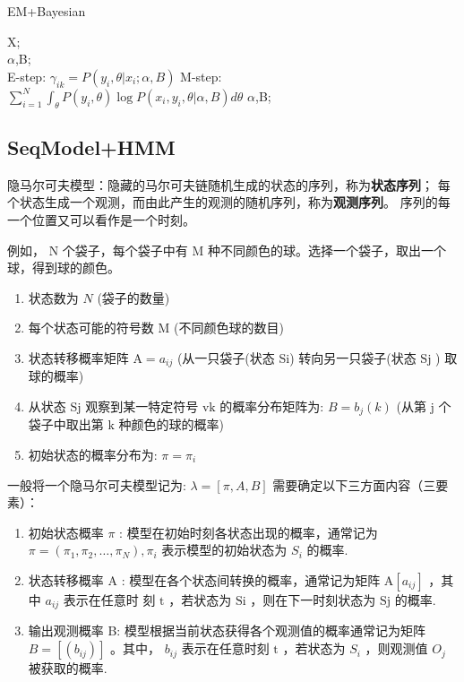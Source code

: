 \documentclass[UTF8]{ctexart}
\begin{document}
\begin{algorithm}[htb]
\caption{EM+Bayesian}
\label{alg:EM+B}
\begin{algorithmic}[1]
\REQUIRE
X; \\
\ENSURE 
$\alpha$,B; \\
\REPEAT 
\STATE E-step: $\gamma_{ik}=P(y_i,\theta|x_i;\alpha,B)$
\STATE M-step: $\sum_{i=1}^N\int_{\theta} P(y_i,\theta) \log P(x_i,y_i,\theta|\alpha,B)d{\theta}$
\UNTIL 
\RETURN $\alpha$,B;
\end{algorithmic}
\end{algorithm}


\subsection{SeqModel+HMM}
隐马尔可夫模型：隐藏的马尔可夫链随机生成的状态的序列，称为\textbf{状态序列}；
每个状态生成一个观测，而由此产生的观测的随机序列，称为\textbf{观测序列}。
序列的每一个位置又可以看作是一个时刻。

例如， $\mathrm{N}$ 个袋子，每个袋子中有 $\mathrm{M}$ 种不同颜色的球。选择一个袋子，取出一个球，得到球的颜色。
\begin{enumerate}
    \item 状态数为 $N$ (袋子的数量)
    \item 每个状态可能的符号数 $\mathrm{M}$ (不同颜色球的数目)
    \item 状态转移概率矩阵 $\mathrm{A}=a_{i j}$ (从一只袋子(状态 Si) 转向另一只袋子(状态 $\mathrm{Sj}$ ) 取球的概率)
    \item 从状态 $\mathrm{Sj}$ 观察到某一特定符号 $\mathrm{vk}$ 的概率分布矩阵为: $B=b_{j}(k)$ (从第 $\mathrm{j}$ 个袋子中取出第 $\mathrm{k}$ 种颜色的球的概率)
    \item 初始状态的概率分布为: $\pi=\pi_{i}$
\end{enumerate}

一般将一个隐马尔可夫模型记为: $\lambda=[\pi, A, B]$
需要确定以下三方面内容（三要素）：
\begin{enumerate}
    \item 初始状态概率 $\pi$ : 模型在初始时刻各状态出现的概率，通常记为 $\pi=\left(\pi_{1}, \pi_{2}, \ldots, \pi_{N}\right), \pi_{i}$ 表示模型的初始状态为 $S_{i}$ 的概率.
    \item 状态转移概率 $\mathrm{A}$ : 模型在各个状态间转换的概率，通常记为矩阵 $\mathrm{A}\left[a_{i j}\right]$ ，其中 $a_{i j}$ 表示在任意时 刻 $\mathrm{t}$ ，若状态为 $\mathrm{Si}$ ，则在下一时刻状态为 $\mathrm{Sj}$ 的概率.
    \item 输出观测概率 B: 模型根据当前状态获得各个观测值的概率通常记为矩阵 $B=\left[\left(b_{i j}\right)\right]$ 。其中， $b_{i j}$ 表示在任意时刻 $\mathrm{t}$ ，若状态为 $S_{i}$ ，则观测值 $O_{j}$ 被获取的概率.
\end{enumerate}
\end{document}
